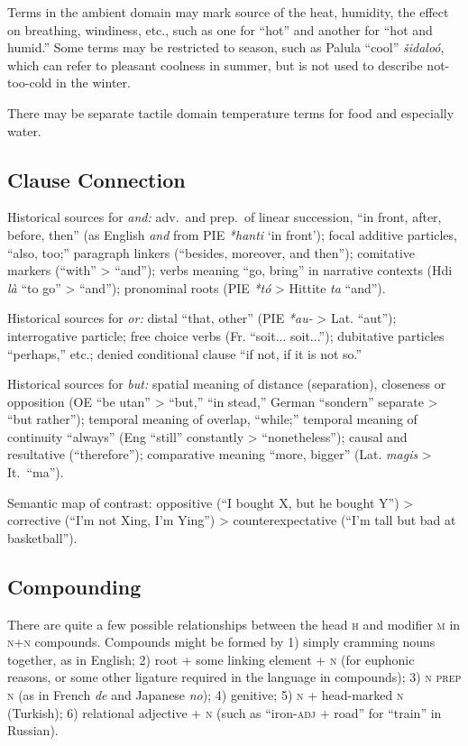 \documentclass[11pt]{article}
\newcommand{\E}[1]{\textit{#1}}   %
\newcommand{\I}[1]{\textsc{#1}}   %
\begin{document}
{Terms in the ambient domain may mark source of the heat, humidity, the
effect on breathing, windiness, etc., such as one for ``hot'' and
another for ``hot and humid.''  Some terms may be restricted to
season, such as Palula ``cool'' \textit{šidaloó}, which can refer to
pleasant coolness in summer, but is not used to describe not-too-cold
in the winter.

There may be separate tactile domain temperature terms for food and
especially water.

\subsection{Clause Connection}
Historical sources for \textit{and:} adv.\ and prep.\ of linear
succession, ``in front, after, before, then'' (as English \textit{and}
from PIE \textit{*hanti} `in front'); focal additive particles, ``also,
too;'' paragraph linkers (``besides, moreover, and then''); comitative
markers (``with'' > ``and''); verbs meaning ``go, bring'' in narrative
contexts (Hdi \textit{là} ``to go'' > ``and''); pronominal roots (PIE
\textit{*tó} > Hittite \textit{ta} ``and'').

Historical sources for \textit{or:} distal ``that, other'' (PIE
\textit{*au-} > Lat. ``aut''); interrogative particle; free choice
verbs (Fr. ``soit... soit...''); dubitative particles ``perhaps,''
etc.; denied conditional clause ``if not, if it is not so.''

Historical sources for \textit{but:} spatial meaning of distance
(separation), closeness or opposition (OE ``be utan'' > ``but,'' ``in
stead,'' German ``sondern'' separate > ``but rather''); temporal
meaning of overlap, ``while;'' temporal meaning of continuity
``always'' (Eng ``still'' constantly > ``nonetheless''); causal and
resultative (``therefore''); comparative meaning ``more, bigger''
(Lat. \textit{magis} > It.\ ``ma'').

Semantic map of contrast: oppositive (``I bought X, but he bought Y'')
> corrective (``I'm not Xing, I'm Ying'') > counterexpectative (``I'm
tall but bad at basketball'').

\subsection{Compounding}
There are quite a few possible relationships between the head \I{h}
and modifier \I{m} in \I{n+n} compounds.  Compounds might be formed by
1) simply cramming nouns together, as in English; 2) root + some
linking element + \I{n} (for euphonic reasons, or some other ligature
required in the language in compounds); 3) \I{n prep n} (as in French
\E{de} and Japanese \E{no}); 4) genitive; 5) \I{n} + head-marked \I{n}
(Turkish); 6) relational adjective + \I{n} (such as ``iron-\I{adj} +
road'' for ``train'' in Russian).

}
\end{document}
